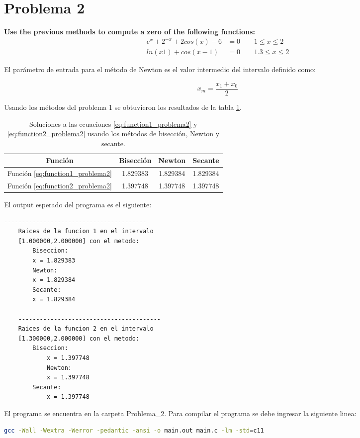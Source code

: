 \section*{Problema 2}
\textbf{Use the previous methods to compute a zero of the following functions:}
\begin{align}
	e^x+2^{-x} + 2cos(x) - 6 & =0  \qquad 1\leq   x \leq 2  \label{eq:function1_problema2} \\
	ln(x1)+cos(x-1)          & =0  \qquad 1.3\leq x \leq 2 \label{eq:function2_problema2}
\end{align}

El parámetro de entrada para el método de Newton es el valor intermedio del intervalo definido como:

\begin{equation*}
	x_{m}= \frac{x_1+x_0}{2}
\end{equation*}

Usando los métodos del problema 1 se obtuvieron los resultados de la tabla \ref{table:solutions_problema2}.

\begin{table}[H]
	\centering
	\begin{tabular}{cccc} \hline
		\textbf{Función}                     & \textbf{Bisección} & \textbf{Newton} & \textbf{Secante} \\ \hline
		Función \ref{eq:function1_problema2} & 1.829383           & 1.829384        & 1.829384         \\
		Función \ref{eq:function2_problema2} & 1.397748           & 1.397748        & 1.397748         \\ \hline
	\end{tabular}
	\caption{Soluciones a las ecuaciones \ref{eq:function1_problema2} y \ref{eq:function2_problema2} usando los métodos de bisección, Newton y secante.}
	\label{table:solutions_problema2}
\end{table}


El output esperado del programa es el siguiente:
\begin{lstlisting}[language=bash]
    ----------------------------------------
    Raices de la funcion 1 en el intervalo
    [1.000000,2.000000] con el metodo:
        Biseccion:
        x = 1.829383
        Newton:
        x = 1.829384
        Secante:
        x = 1.829384
    
    ----------------------------------------
    Raices de la funcion 2 en el intervalo
    [1.300000,2.000000] con el metodo:
        Biseccion:
            x = 1.397748
            Newton:
            x = 1.397748
        Secante:
            x = 1.397748
\end{lstlisting}
El programa se encuentra en la carpeta \textcolor{citecolor}{Problema\_2}. Para compilar el programa se debe ingresar la siguiente linea:

\begin{lstlisting}[language=bash]
    gcc -Wall -Wextra -Werror -pedantic -ansi -o main.out main.c -lm -std=c11  
\end{lstlisting}
